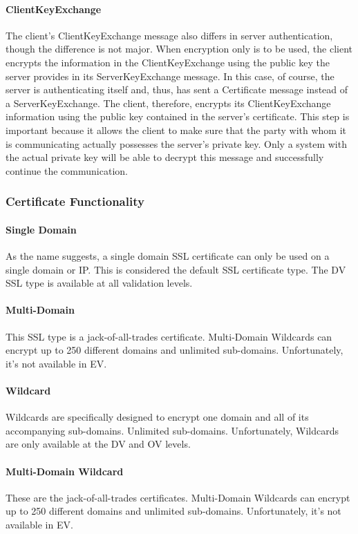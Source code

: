 \paragraph{ClientKeyExchange}
The client’s ClientKeyExchange message also differs in server authentication, 
though the difference is not major. When encryption
only is to be used, the client encrypts the information in the ClientKeyExchange
 using the public key the server provides in its
ServerKeyExchange message. In this case, of course, the server is authenticating
 itself and, thus, has sent a Certificate message instead of
a ServerKeyExchange. The client, therefore, encrypts its ClientKeyExchange information 
using the public key contained in the
server’s certificate. This step is important because it allows the client
to make sure that the party with whom it is communicating actually
possesses the server’s private key. Only a system with the actual private key will 
be able to decrypt this message and successfully continue the communication.

\subsubsection{Certificate Functionality}

\paragraph{Single Domain}
As the name suggests, a single domain SSL certificate can only be used on a single 
domain or IP. This is considered the default SSL certificate type. The DV SSL type is
available at all validation levels.
\paragraph{Multi-Domain}
This SSL type is a jack-of-all-trades certificate. Multi-Domain Wildcards can encrypt
 up to 250 different domains and unlimited sub-domains. Unfortunately, it's not available
  in EV.
\paragraph{Wildcard}
Wildcards are specifically designed to encrypt one domain and all of its accompanying 
sub-domains. Unlimited sub-domains. Unfortunately, Wildcards are only available at the 
DV and OV levels.
\paragraph{Multi-Domain Wildcard}
These are the jack-of-all-trades certificates. Multi-Domain Wildcards can encrypt up 
to 250 different domains and unlimited sub-domains. Unfortunately, it's not available 
in EV.

